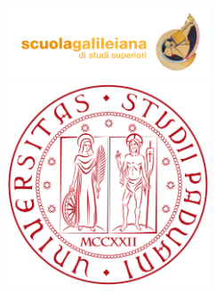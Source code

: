 \begin{titlepage}
	\begin{addmargin}[-1cm]{-3cm}
    \begin{center}
        \large

        \hfill

        \vfill

        \begingroup
            \color{Maroon}\spacedallcaps{\myTitle} \\ \bigskip
        \endgroup

        \spacedlowsmallcaps{\myName}

        \vfill

        \includegraphics[width=6cm]{gfx/logo_gali.jpg} \\ \medskip
        \includegraphics[width=6cm]{gfx/logo_unipd.png} \\[4cm]

        \myProf \\
        \myDepartment \\
        \myUni \\ \bigskip

        \myTime

        \vfill

    \end{center}
  \end{addmargin}
\end{titlepage}
